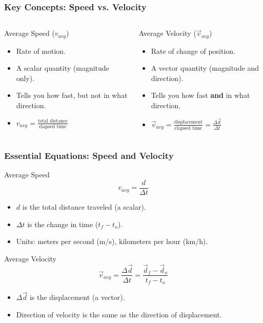 \documentclass{beamer}
\begin{document}
\begin{frame}
\frametitle{Key Concepts: Speed vs. Velocity}
\begin{columns}[T]
    \begin{block}{Average Speed ($v_{avg}$)}
        \begin{itemize}
            \item Rate of motion.
            \item A \alert{scalar} quantity (magnitude only).
            \item Tells you how fast, but not in what direction.
            \item $v_{avg} = \frac{\text{total distance}}{\text{elapsed time}}$
        \end{itemize}
    \end{block}
    \pause
    \begin{block}{Average Velocity ($\vec{v}_{avg}$)}
        \begin{itemize}
            \item Rate of change of position.
            \item A \alert{vector} quantity (magnitude and direction).
            \item Tells you how fast \textbf{and} in what direction.
            \item $\vec{v}_{avg} = \frac{\text{displacement}}{\text{elapsed time}} = \frac{\Delta \vec{d}}{\Delta t}$
        \end{itemize}
    \end{block}
\end{columns}
\end{frame}

\begin{frame}
\frametitle{Essential Equations: Speed and Velocity}
\begin{block}{Average Speed}
\[ v_{avg} = \frac{d}{\Delta t} \]
\begin{itemize}
    \item $d$ is the total distance traveled (a scalar).
    \item $\Delta t$ is the change in time ($t_f - t_o$).
    \item Units: meters per second (m/s), kilometers per hour (km/h).
\end{itemize}
\end{block}
\pause
\begin{block}{Average Velocity}
\[ \vec{v}_{avg} = \frac{\Delta \vec{d}}{\Delta t} = \frac{\vec{d}_f - \vec{d}_o}{t_f - t_o} \]
\begin{itemize}
    \item $\Delta \vec{d}$ is the displacement (a vector).
    \item Direction of velocity is the same as the direction of displacement.
\end{itemize}
\end{block}
\end{frame}
\end{document}
